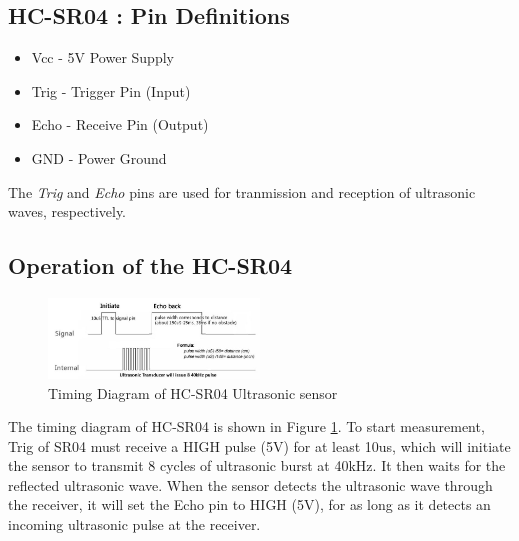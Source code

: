 \subsection{HC-SR04 : Pin Definitions}
\begin{itemize}
	\item Vcc  - 5V Power Supply
	\item Trig - Trigger Pin (Input)
	\item Echo - Receive Pin (Output)
	\item GND  - Power Ground
\end{itemize}
The \emph{Trig} and \emph{Echo} pins are used for tranmission and reception of ultrasonic waves, respectively. 

\subsection{Operation of the HC-SR04}
\begin{figure}[H]
	\centering
	\includegraphics[width=0.5\textwidth]{../Files/hcsr_timing.png}
	\caption{Timing Diagram of HC-SR04 Ultrasonic sensor}  \label{fig:HCSRTiming}
\end{figure}
The timing diagram of HC-SR04 is shown in Figure \ref{fig:HCSRTiming}. To start measurement, Trig of SR04 must receive a HIGH pulse (5V) for at least 10us, which will initiate the sensor to transmit 8 cycles of ultrasonic burst at 40kHz. It then waits for the reflected ultrasonic wave. When the sensor detects the ultrasonic wave through the receiver, it will set the Echo pin to HIGH (5V), for as long as it detects an incoming ultrasonic pulse at the receiver.

